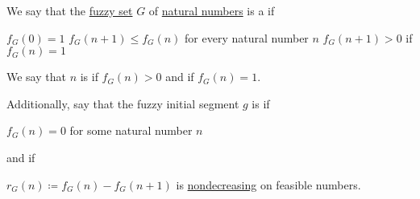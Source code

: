 \begin{definition}\label{def:fuzzy_initial_segment}
  We say that the \hyperref[def:fuzzy_set]{fuzzy set} \( G \) of \hyperref[def:natural_numbers]{natural numbers} is a  if
  \begin{thmenum}[series=def:fuzzy_initial_segment]
     \( f_G(0) = 1 \)
     \( f_G(n + 1) \leq f_G(n) \) for every natural number \( n \)
     \( f_G(n + 1) > 0 \) if \( f_G(n) = 1 \)
  \end{thmenum}

  We say that \( n \) is  if \( f_G(n) > 0 \) and  if \( f_G(n) = 1 \).

  Additionally, say that the fuzzy initial segment \( g \) is  if
  \begin{thmenum}[resume=def:fuzzy_initial_segment]
     \( f_G(n) = 0 \) for some natural number \( n \)
  \end{thmenum}
  and  if
  \begin{thmenum}[resume=def:fuzzy_initial_segment]
     \( r_G(n) \coloneqq f_G(n) - f_G(n + 1) \) is \hyperref[def:order_function/increasing]{nondecreasing} on feasible numbers.
  \end{thmenum}
\end{definition}

